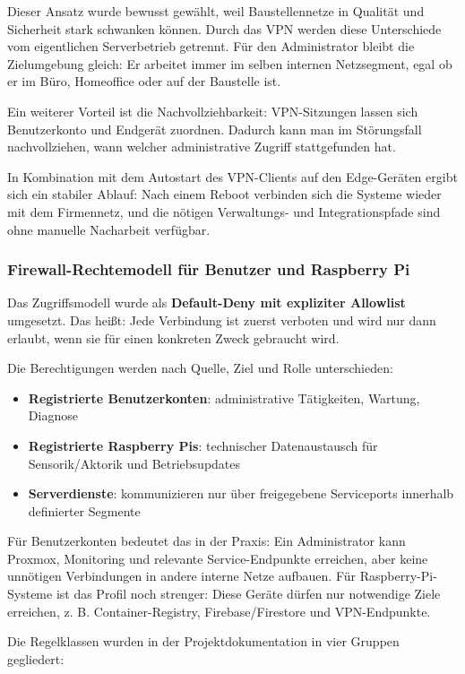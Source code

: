 Dieser Ansatz wurde bewusst gewählt, weil Baustellennetze in Qualität und Sicherheit stark schwanken können. Durch das VPN werden diese Unterschiede vom eigentlichen Serverbetrieb getrennt. Für den Administrator bleibt die Zielumgebung gleich: Er arbeitet immer im selben internen Netzsegment, egal ob er im Büro, Homeoffice oder auf der Baustelle ist.

Ein weiterer Vorteil ist die Nachvollziehbarkeit: VPN-Sitzungen lassen sich Benutzerkonto und Endgerät zuordnen. Dadurch kann man im Störungsfall nachvollziehen, wann welcher administrative Zugriff stattgefunden hat.

In Kombination mit dem Autostart des VPN-Clients auf den Edge-Geräten ergibt sich ein stabiler Ablauf: Nach einem Reboot verbinden sich die Systeme wieder mit dem Firmennetz, und die nötigen Verwaltungs- und Integrationspfade sind ohne manuelle Nacharbeit verfügbar.

\subsubsection{Firewall-Rechtemodell für Benutzer und Raspberry Pi}

Das Zugriffsmodell wurde als \textbf{Default-Deny mit expliziter Allowlist} umgesetzt. Das heißt: Jede Verbindung ist zuerst verboten und wird nur dann erlaubt, wenn sie für einen konkreten Zweck gebraucht wird.

Die Berechtigungen werden nach Quelle, Ziel und Rolle unterschieden:

\begin{itemize}
    \item \textbf{Registrierte Benutzerkonten}: administrative Tätigkeiten, Wartung, Diagnose
    \item \textbf{Registrierte Raspberry Pis}: technischer Datenaustausch für Sensorik/Aktorik und Betriebsupdates
    \item \textbf{Serverdienste}: kommunizieren nur über freigegebene Serviceports innerhalb definierter Segmente
\end{itemize}

Für Benutzerkonten bedeutet das in der Praxis: Ein Administrator kann Proxmox, Monitoring und relevante Service-Endpunkte erreichen, aber keine unnötigen Verbindungen in andere interne Netze aufbauen. Für Raspberry-Pi-Systeme ist das Profil noch strenger: Diese Geräte dürfen nur notwendige Ziele erreichen, z. B. Container-Registry, Firebase/Firestore und VPN-Endpunkte.

Die Regelklassen wurden in der Projektdokumentation in vier Gruppen gegliedert:

